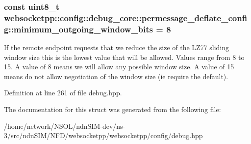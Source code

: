 \subsubsection[{\texorpdfstring{minimum\+\_\+outgoing\+\_\+window\+\_\+bits}{minimum\_outgoing\_window\_bits}}]{\setlength{\rightskip}{0pt plus 5cm}const uint8\+\_\+t websocketpp\+::config\+::debug\+\_\+core\+::permessage\+\_\+deflate\+\_\+config\+::minimum\+\_\+outgoing\+\_\+window\+\_\+bits = 8\hspace{0.3cm}{\ttfamily [static]}}\hypertarget{structwebsocketpp_1_1config_1_1debug__core_1_1permessage__deflate__config_ae9ce7b9a7a002339d80dca046e940867}{}\label{structwebsocketpp_1_1config_1_1debug__core_1_1permessage__deflate__config_ae9ce7b9a7a002339d80dca046e940867}
If the remote endpoint requests that we reduce the size of the L\+Z77 sliding window size this is the lowest value that will be allowed. Values range from 8 to 15. A value of 8 means we will allow any possible window size. A value of 15 means do not allow negotiation of the window size (ie require the default). 

Definition at line 261 of file debug.\+hpp.



The documentation for this struct was generated from the following file\+:\begin{DoxyCompactItemize}
\item 
/home/network/\+N\+S\+O\+L/ndn\+S\+I\+M-\/dev/ns-\/3/src/ndn\+S\+I\+M/\+N\+F\+D/websocketpp/websocketpp/config/debug.\+hpp\end{DoxyCompactItemize}
